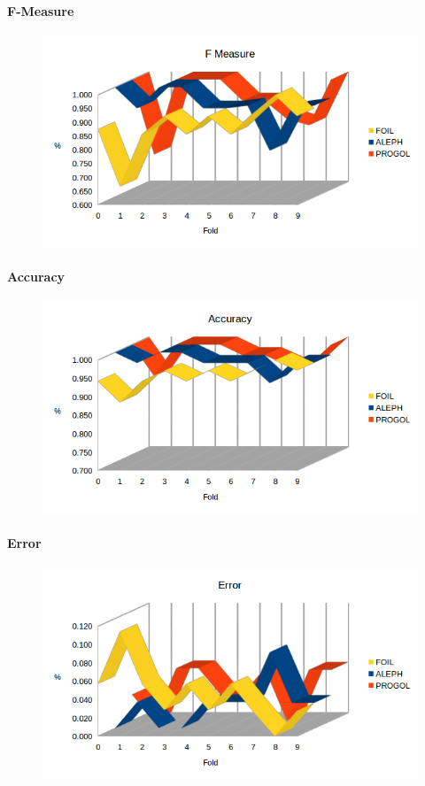 \paragraph{F-Measure}
\begin{figure}[hbtp]
	\includegraphics[width=1.2\textwidth]{img/datasetGraph/svln/fm.png}
	\label{svln-F-measure}
\end{figure}
\paragraph{Accuracy}
\begin{figure}[hbtp]
	\includegraphics[width=1.2\textwidth]{img/datasetGraph/svln/accuracy.png}
	\label{svln-Accuracy}
\end{figure}
\paragraph{Error}
\begin{figure}[hbtp]
	\includegraphics[width=1.2\textwidth]{img/datasetGraph/svln/error.png}
	\label{svln-Error}
\end{figure}

